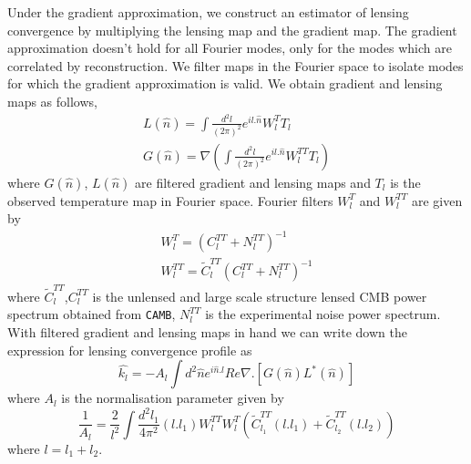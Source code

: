  Under the gradient approximation, we construct an estimator of lensing convergence by multiplying the lensing map and the gradient map.
The gradient approximation doesn't hold for all Fourier modes, only for the modes which are correlated by reconstruction.
We filter maps in the Fourier space to isolate modes for which the gradient approximation is valid.
 We obtain gradient and lensing maps as follows,
  \begin{eqnarray}
  L(\hat{n}) = \int \frac{d^{2}l}{(2\pi)^{2}} e^{il .\hat{n}} W^{T}_{l} T_{l}\\
  G(\hat{n}) = \nabla (\int\frac{d^{2}l}{(2\pi)^{2}} e^{il .\hat{n}} W^{TT}_{l} T_{l}   )
  \end{eqnarray}
  where $G(\hat{n})$, $L(\hat{n})$ are filtered gradient and lensing maps and $T_{l}$ is the observed temperature map in Fourier space.  
 Fourier filters $W^{T}_{l}$ and $W^{TT}_{l}$ are given by 
 \begin{eqnarray}
 W^{T}_{l} = (C^{TT}_{l} + N^{TT}_{l})^{-1}\\
 W^{TT}_{l} =  \widetilde{C}^{TT}_{l}(C^{TT}_{l} + N^{TT}_{l})^{-1}
 \end{eqnarray}
 where  $\widetilde{C}^{TT}_{l}$,$C^{TT}_{l} $  is the unlensed and large scale structure lensed CMB power spectrum obtained from \texttt{CAMB}, $ N^{TT}_{l}$ is the experimental noise power spectrum.
 With filtered gradient and lensing maps in hand we can write down the expression for lensing convergence profile as 
 \begin{equation}
 \hat{k_{l}} = -A_{l} \int d^{2} \hat{n} e^{i\hat{n}.l} Re{\nabla .[G(\hat{n}) L^{*}(\hat{n})]}
 \end{equation}
 where $A_{l}$ is the normalisation parameter given by
 \begin{equation}
 \frac{1}{A_{l}} = \frac{2}{l^{2}} \int \frac{d^{2}l_{1}}{4\pi^{2}} (l.l_{1}) W^{TT}_{l} W^{T}_{l} (\tilde{C}^{TT}_{l_{1}}(l.l_{1}) + \tilde{C}^{TT}_{l_{2}}(l.l_{2}))
 \end{equation}
 where $l = l_{1}  + l_{2}$. 
